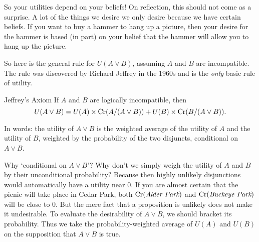 So your utilities depend on your beliefs! On reflection, this should
not come as a surprise. A lot of the things we desire we only desire
because we have certain beliefs. If you want to buy a hammer to hang
up a picture, then your desire for the hammer is based (in part) on your belief
that the hammer will allow you to hang up the picture. 


So here is the general rule for $U(A \lor B)$, assuming $A$ and $B$
are incompatible. The rule was discovered by Richard Jeffrey in the
1960s and is the \emph{only} basic rule of utility.
\newpage
%
\begin{genericthm}{Jeffrey's Axiom}
  If $A$ and $B$ are logically incompatible, then 
  \[ U(A \lor B) =
  U(A)\times \text{Cr}(A/(A\lor B)) + U(B)\times \text{Cr}(B/(A \lor B)). \]
\end{genericthm}
%
In words: the utility of $A \lor B$ is the weighted average of the
utility of $A$ and the utility of $B$, weighted by the probability of
the two disjuncts, conditional on $A \lor B$.

Why `conditional on $A \lor B$'? Why don't we simply weigh the utility
of $A$ and $B$ by their unconditional probability? Because then highly
unlikely disjunctions would automatically have a utility near 0. If
you are almost certain that the picnic will take place in Cedar Park,
both $\text{Cr}(\emph{Alder Park})$ and $\text{Cr}(\emph{Buckeye Park})$ will be
close to 0. But the mere fact that a proposition is unlikely does
not make it undesirable. To evaluate the desirability of $A \lor B$,
we should bracket its probability. Thus we take the
probability-weighted average of $U(A)$ and $U(B)$ on the supposition
that $A \lor B$ is true.

